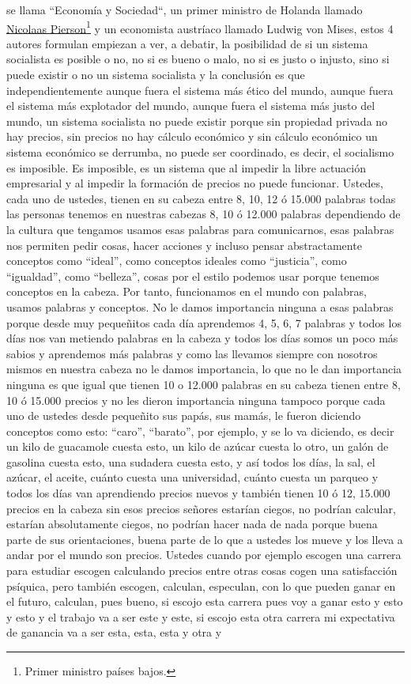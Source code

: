 se llama ``Economía y Sociedad``\cite{weber1921economy}, un primer ministro de Holanda llamado \href{https://en.wikipedia.org/wiki/Nicolaas_Pierson}{Nicolaas Pierson}\footnote{Primer ministro países bajos.} y un economista austríaco llamado Ludwig von Mises, estos 4 autores formulan empiezan a ver, a debatir, la posibilidad de si un sistema socialista es posible o no, no si es bueno o malo, no si es justo o injusto, sino si puede existir o no un sistema socialista y la conclusión es que independientemente aunque fuera el sistema más ético del mundo, aunque fuera el sistema más explotador del mundo, aunque fuera el sistema más justo del mundo, un sistema socialista no puede existir porque sin propiedad privada no hay precios, sin precios no hay cálculo económico y sin cálculo económico un sistema económico se derrumba, no puede ser coordinado, es decir, el socialismo es imposible. Es imposible, es un sistema que al impedir la libre actuación empresarial y al impedir la formación de precios no puede funcionar. Ustedes, cada uno de ustedes, tienen en su cabeza entre 8, 10, 12 ó 15.000 palabras todas las personas tenemos en nuestras cabezas 8, 10 ó 12.000 palabras dependiendo de la cultura que tengamos usamos esas palabras para comunicarnos, esas palabras nos permiten pedir cosas, hacer acciones y incluso pensar abstractamente conceptos como \enquote{ideal}, como conceptos ideales como \enquote{justicia}, como \enquote{igualdad}, como \enquote{belleza}, cosas por el estilo podemos usar porque tenemos conceptos en la cabeza. Por tanto, funcionamos en el mundo con palabras, usamos palabras y conceptos. No le damos importancia ninguna a esas palabras porque desde muy pequeñitos cada día aprendemos 4, 5, 6, 7 palabras y todos los días nos van metiendo palabras en la cabeza y todos los días somos un poco más sabios y aprendemos más palabras y como las llevamos siempre con nosotros mismos en nuestra cabeza no le damos importancia, lo que no le dan importancia ninguna es que igual que tienen 10 o 12.000 palabras en su cabeza tienen entre 8, 10 ó 15.000 precios y no les dieron importancia ninguna tampoco porque cada uno de ustedes desde pequeñito sus papás, sus mamás, le fueron diciendo conceptos como esto: \enquote{caro}, \enquote{barato}, por ejemplo, y se lo va diciendo, es decir un kilo de guacamole cuesta esto, un kilo de azúcar cuesta lo otro, un galón de gasolina cuesta esto, una sudadera cuesta esto, y así todos los días, la sal, el azúcar, el aceite, cuánto cuesta una universidad, cuánto cuesta un parqueo y todos los días van aprendiendo precios nuevos y también tienen 10 ó 12, 15.000 precios en la cabeza sin esos precios señores estarían ciegos, no podrían calcular, estarían absolutamente ciegos, no podrían hacer nada de nada porque buena parte de sus orientaciones, buena parte de lo que a ustedes los mueve y los lleva a andar por el mundo son precios. Ustedes cuando por ejemplo escogen una carrera para estudiar escogen calculando precios entre otras cosas cogen una satisfacción psíquica, pero también escogen, calculan, especulan, con lo que pueden ganar en el futuro, calculan, pues bueno, si escojo esta carrera pues voy a ganar esto y esto y esto y el trabajo va a ser este y este, si escojo esta otra carrera mi expectativa de ganancia va a ser esta, esta, esta y otra y 